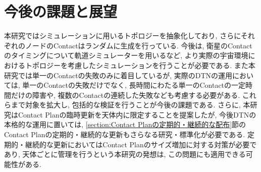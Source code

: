 \section{今後の課題と展望}
本研究ではシミュレーションに用いるトポロジーを抽象化しており, 
さらにそれぞれのノードのContactはランダムに生成を行っている. 
今後は, 衛星のContactのタイミングについて軌道シミュレーターを用いるなど, 
より実際の宇宙環境におけるトポロジーを考慮したシミュレーションを行うことが必要である. 
また本研究では単一のContactの失敗のみに着目しているが, 
実際のDTNの運用においては, 単一のContactの失敗だけでなく, 
長時間にわたる単一のContactの一定時間だけの障害や, 
複数のContactの連続した失敗なども考慮する必要がある. 
これらまで対象を拡大し, 包括的な検証を行うことが今後の課題である. 
さらに, 本研究はContact Planの臨時更新を天体内に限定することを提案したが, 
今後DTNの本格的な運用に置いては, \ref{section:Contact Planの定期的・継続的な配布}節の
Contact Planの定期的・継続的な更新もさらなる研究・標準化が必要である. 
定期的・継続的な更新においてはContact Planのサイズ増加に対する対策が必要であり, 
天体ごとに管理を行うという本研究の発想は, この問題にも適用できる可能性がある. 
